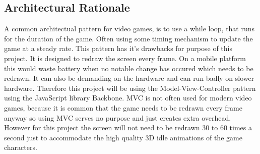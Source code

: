 \subsection{Architectural Rationale}

A common architectual pattern for video games, is to use a while loop, that runs for the duration of the game. Often using some timing mechanism to update the game at a steady rate. This pattern has it's drawbacks for purpose of this project. It is designed to redraw the screen every frame. On a mobile platform this would waste battery when no notable change has occured which needs to be redrawn. It can also be demanding on the hardware and can run badly on slower hardware. Therefore this project will be using the Model-View-Controller pattern using the JavaScript library Backbone. MVC is not often used for modern video games, because it is common that the game needs to be redrawn every frame anyway so using MVC serves no purpose and just creates extra overhead. However for this project the screen will not need to be redrawn 30 to 60 times a second just to accommodate the high quality 3D idle animations of the game characters.
